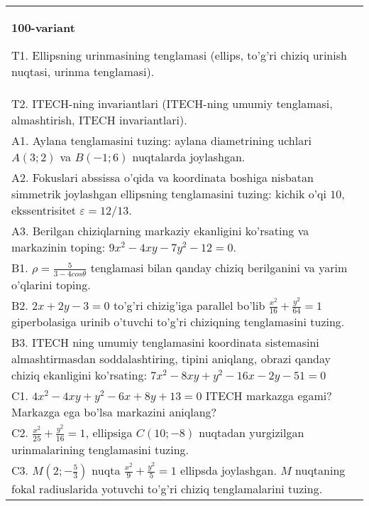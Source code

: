 \documentclass{article}
\begin{document}
\begin{tabular}{m{17cm}}
\textbf{100-variant}
\newline

T1. Ellipsning urinmasining tenglamasi (ellips, to'g'ri chiziq urinish nuqtasi, urinma tenglamasi).\\

T2. ITECH-ning invariantlari (ITECH-ning umumiy tenglamasi, almashtirish, ITECH invariantlari).\\

A1. Aylana tenglamasini tuzing: aylana diametrining uchlari $A(3;2)$ va $B(-1;6)$ nuqtalarda joylashgan.\\

A2. Fokuslari abssissa o'qida va koordinata boshiga nisbatan simmetrik joylashgan ellipsning tenglamasini tuzing: kichik o'qi $10$, ekssentrisitet $\varepsilon=12/13$.\\

A3. Berilgan chiziqlarning markaziy ekanligini ko'rsating va markazinin toping: $9x^{2}-4xy-7y^{2}-12=0$.\\

B1. $\rho = \frac{5}{3 - 4cos\theta}$ tenglamasi bilan qanday chiziq berilganini va yarim o'qlarini toping.  \\

B2. $2x + 2y - 3 = 0$ to'g'ri chizig'iga parallel bo'lib $\frac{x^{2}}{16} + \frac{y^{2}}{64} = 1$ giperbolasiga urinib o'tuvchi to'g'ri chiziqning tenglamasini tuzing.  \\

B3. ITECH ning umumiy tenglamasini koordinata sistemasini almashtirmasdan soddalashtiring, tipini aniqlang, obrazi qanday chiziq ekanligini ko'rsating: $7x^{2} - 8xy + y^{2} - 16x - 2y - 51 = 0$\\

C1. $4x^{2} - 4xy + y^{2} - 6x + 8y + 13 = 0$ ITECH markazga egami? Markazga ega bo'lsa markazini aniqlang?  \\

C2. $\frac{x^{2}}{25} + \frac{y^{2}}{16} = 1$, ellipsiga $C(10; - 8)$ nuqtadan yurgizilgan urinmalarining tenglamasini tuzing.  \\

C3. $M(2; - \frac{5}{3})$ nuqta $\frac{x^{2}}{9} + \frac{y^{2}}{5} = 1$ ellipsda joylashgan. $M$ nuqtaning fokal radiuslarida yotuvchi to'g'ri chiziq tenglamalarini tuzing.  \\

\end{tabular}
\vspace{1cm}
\end{document}
